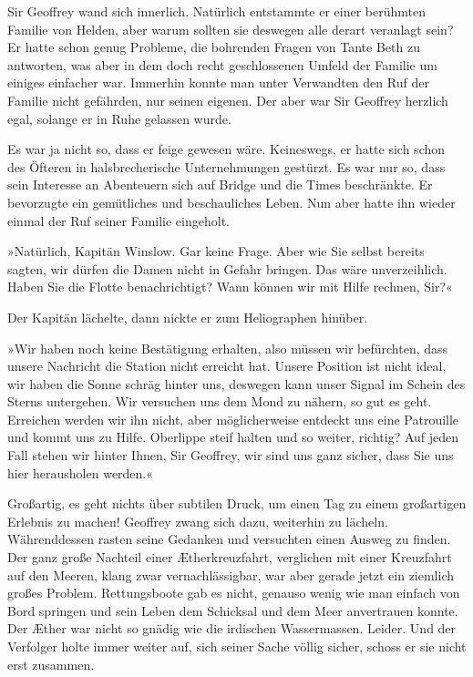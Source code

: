 \bigpar

Sir Geoffrey wand sich innerlich. Natürlich entstammte er einer
berühmten Familie von Helden, aber warum sollten sie deswegen alle
derart veranlagt sein? Er hatte schon genug Probleme, die bohrenden
Fragen von Tante Beth zu antworten, was aber in dem doch recht
geschlossenen Umfeld der Familie um einiges einfacher war. Immerhin
konnte man unter Verwandten den Ruf der Familie nicht gefährden,
nur seinen eigenen. Der aber war Sir Geoffrey herzlich egal,
solange er in Ruhe gelassen wurde.

Es war ja nicht so, dass er feige gewesen wäre. Keineswegs, er
hatte sich schon des Öfteren in halsbrecherische Unternehmungen
gestürzt. Es war nur so, dass sein Interesse an Abenteuern sich auf
Bridge und die Times beschränkte. Er bevorzugte ein gemütliches und
beschauliches Leben. Nun aber hatte ihn wieder einmal der Ruf
seiner Familie eingeholt.

»Natürlich, Kapitän Winslow. Gar keine Frage. Aber wie Sie selbst
bereits sagten, wir dürfen die Damen nicht in Gefahr bringen. Das
wäre unverzeihlich. Haben Sie die Flotte benachrichtigt? Wann
können wir mit Hilfe rechnen, Sir?«

Der Kapitän lächelte, dann nickte er zum Heliographen hinüber.

»Wir haben noch keine Bestätigung erhalten, also müssen wir
befürchten, dass unsere Nachricht die Station nicht erreicht hat.
Unsere Position ist nicht ideal, wir haben die Sonne schräg hinter
uns, deswegen kann unser Signal im Schein des Sterns untergehen.
Wir versuchen uns dem Mond zu nähern, so gut es geht. Erreichen
werden wir ihn nicht, aber möglicherweise entdeckt uns eine
Patrouille und kommt uns zu Hilfe. Oberlippe steif halten und so
weiter, richtig? Auf jeden Fall stehen wir hinter Ihnen, Sir
Geoffrey, wir sind uns ganz sicher, dass Sie uns hier herausholen
werden.«

Großartig, es geht nichts über subtilen Druck, um einen Tag zu
einem großartigen Erlebnis zu machen! Geoffrey zwang sich dazu,
weiterhin zu lächeln. Währenddessen rasten seine Gedanken und
versuchten einen Ausweg zu finden. Der ganz große Nachteil einer
Ætherkreuzfahrt, verglichen mit einer Kreuzfahrt auf den Meeren,
klang zwar vernachlässigbar, war aber gerade jetzt ein ziemlich
großes Problem. Rettungsboote gab es nicht, genauso wenig wie man
einfach von Bord springen und sein Leben dem Schicksal und dem Meer
anvertrauen konnte. Der Æther war nicht so gnädig wie die irdischen
Wassermassen. Leider. Und der Verfolger holte immer weiter auf,
sich seiner Sache völlig sicher, schoss er sie nicht erst
zusammen.

